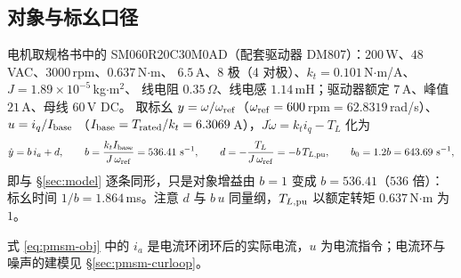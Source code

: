 \documentclass[11pt]{article}
\theoremstyle{remark}\newtheorem{remark}{注}
\begin{document}
\subsection{对象与标幺口径}
电机取规格书中的 SM060R20C30M0AD（配套驱动器 DM807）：$200$\,W、$48$\,VAC、$3000$\,rpm、$0.637$\,N$\cdot$m、
$6.5$\,A、8 极（4 对极）、$k_t=0.101$\,N$\cdot$m/A、$J=1.89\times10^{-5}$\,kg$\cdot$m$^2$、
线电阻 $0.35\,\Omega$、线电感 $1.14$\,mH；驱动器额定 $7$\,A、峰值 $21$\,A、母线 $60$\,V DC。
取标幺 $y=\omega/\omega_{\rm ref}$（$\omega_{\rm ref}=600$\,rpm$=62.8319$\,rad/s）、$u=i_q/I_{\rm base}$
（$I_{\rm base}=T_{\rm rated}/k_t=6.3069$\,A），$J\dot\omega=k_ti_q-T_L$ 化为
\begin{equation}
\dot y=b\,i_a+d,\qquad b=\frac{k_tI_{\rm base}}{J\,\omega_{\rm ref}}=536.41\ \mathrm{s^{-1}},\qquad
d=-\frac{T_L}{J\,\omega_{\rm ref}}=-b\,T_{L,\rm pu},\qquad b_0=1.2b=643.69\ \mathrm{s^{-1}},
\label{eq:pmsm-obj}
\end{equation}
即与 §\ref{sec:model} 逐条同形，只是对象增益由 $b=1$ 变成 $b=536.41$（$536$ 倍）：标幺时间
$1/b=1.864$\,ms。注意 $d$ 与 $b\,u$ 同量纲，$T_{L,\rm pu}$ 以额定转矩 $0.637$\,N$\cdot$m 为 $1$。

式 \eqref{eq:pmsm-obj} 中的 $i_a$ 是电流环闭环后的实际电流，$u$ 为电流指令；电流环与噪声的建模见 §\ref{sec:pmsm-curloop}。
\end{document}
